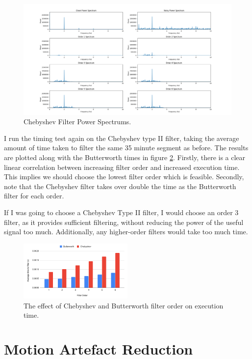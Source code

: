 \documentclass[12pt,a4paper,twoside,openright]{report}
\begin{document}
\begin{figure}
	\centering
	\includegraphics[width=\textwidth]{figs/cheby2-validity.png}
	\caption{Chebyshev Filter Power Spectrums.}
	\label{fig:cheby2-validity}
\end{figure}

I run the timing test again on the Chebyshev type II filter, taking the average amount
of time taken to filter the same 35 minute segment as before. The results are
plotted along with the Butterworth times in figure \ref{fig:cheby2-time}. 
Firstly, there is a clear linear
correlation between increasing filter order and increased execution time. This
implies we should choose the lowest filter order which is feasible. Secondly,
note that the Chebyshev filter takes over double the time as the
Butterworth filter for each order.

If I was going to choose a Chebyshev Type II filter, I would choose an order 3
filter, as it provides sufficient filtering, without reducing the power of the
useful signal too much. Additionally, any higher-order filters would take too
much time.

\begin{figure}[tbh]
	\centerline{\includegraphics[width=0.5\textwidth]{figs/cheby2andbutter-time.png}}
	\caption{The effect of Chebyshev and Butterworth filter order on execution time.}
	\label{fig:cheby2-time}
\end{figure}


\section{Motion Artefact Reduction}
\end{document}
